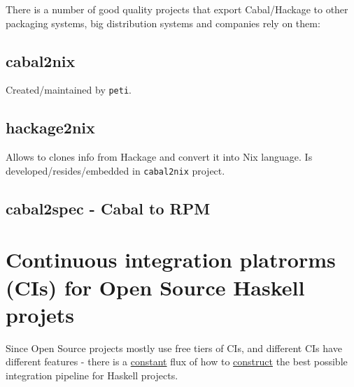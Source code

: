 \documentclass[a4paper,14pt,oneside]{book}
\begin{document}
There is a number of good quality projects that export Cabal/Hackage to other packaging systems, big distribution systems and companies rely on them:

\section{cabal2nix}
\label{sec:org5fa93cc}

Created/maintained by \texttt{peti}.

\section{hackage2nix}
\label{sec:orgd3e98db}

Allows to clones info from Hackage and convert it into Nix language.
Is developed/resides/embedded in \texttt{cabal2nix} project.

\section{cabal2spec - Cabal to RPM}
\label{sec:org3d435ad}

\chapter{Continuous integration platrorms (CIs) for Open Source Haskell projets}
\label{sec:org4ac8506}

Since Open Source projects mostly use free tiers of CIs, and different CIs have different features - there is a \hyperref[org048ef91]{constant} flux of how to \hyperref[org93a1402]{construct} the best possible integration pipeline for Haskell projects.
\end{document}
